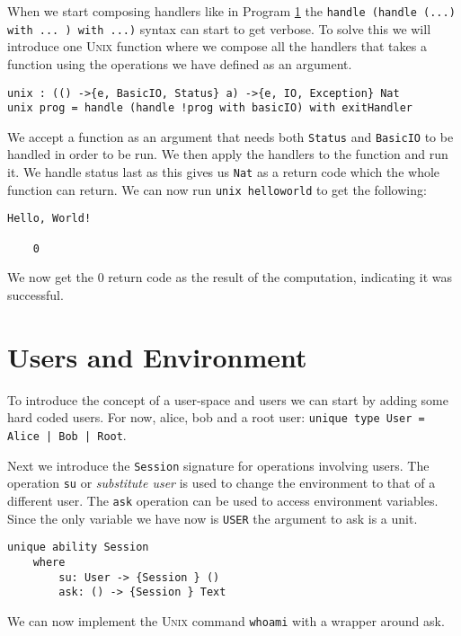 \documentclass[logo,bsc,singlespacing,parskip]{infthesis}
\begin{document}
When we start composing handlers like in Program \hyperref[prog:helloworld]{1}
the \texttt{handle (handle (...) with ... ) with ...)} syntax can start to get
verbose. To solve this we will introduce one \textsc{Unix} function where we
compose all the handlers that takes a function using the operations we have
defined as an argument.

\begin{lstlisting}[language=unison]
unix : (() ->{e, BasicIO, Status} a) ->{e, IO, Exception} Nat
unix prog = handle (handle !prog with basicIO) with exitHandler
\end{lstlisting}

We accept a function as an argument that needs both \texttt{Status} and
\texttt{BasicIO} to be handled in order to be run. We then apply the handlers
to the function and run it. We handle status last as this gives us \texttt{Nat}
as a return code which the whole function can return. We can now run
\texttt{unix helloworld} to get the following:

\begin{lstlisting}[language=unison]
  Hello, World!

    0
\end{lstlisting}

We now get the 0 return code as the result of the computation, indicating it was successful.

\section{Users and Environment}
\label{userspace}

To introduce the concept of a user-space and users we can start by adding some
hard coded users. For now, alice, bob and a root user: \texttt{unique type User
= Alice | Bob | Root}.

Next we introduce the \texttt{Session} signature for operations involving
users. The operation \texttt{su} or \emph{substitute user} is used to change
the environment to that of a different user. The \texttt{ask} operation can be
used to access environment variables. Since the only variable we have now is
\texttt{USER} the argument to ask is a unit.

\begin{lstlisting}[language=unison]
unique ability Session
    where
        su: User -> {Session } ()
        ask: () -> {Session } Text
\end{lstlisting}

We can now implement the \textsc{Unix} command \texttt{whoami} with a wrapper
around ask.
\end{document}
